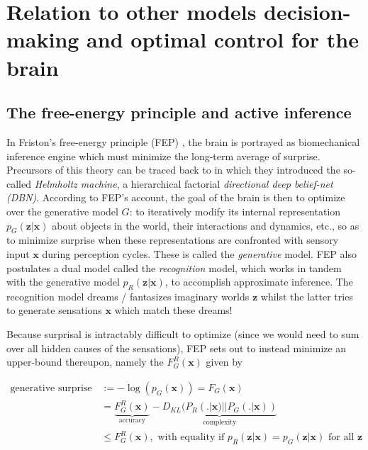 \documentclass[10pt,letterpaper]{article}
\def\z{\mathbf{z}}
\def\x{\mathbf{x}}
\begin{document}
\section{Relation to other models decision-making and optimal control for the brain}
\subsection{The free-energy principle and active inference}
In Friston's free-energy principle (FEP) \citep{friston2010free,fristonAIorRL}, the brain is portrayed
as biomechanical inference engine which must minimize the long-term average of surprise.
Precursors of this theory can be traced back to \citep{dayan1995helmholtz} in which they introduced the so-called \textit{Helmholtz machine}, a hierarchical factorial \textit{directional deep belief-net (DBN)}. According to FEP's account, the goal of the brain is then to optimize over the generative model $G$: to iteratively
modify its internal representation $p_G(\z|\x)$ about objects in the world, their interactions and dynamics, etc., so as to minimize surprise when these representations are confronted with sensory input $\x$ during perception cycles. These is called the \textit{generative} model. FEP also postulates a dual model called the \textit{recognition} model,
which works in tandem with the generative model $p_R(\z|\x)$, to accomplish approximate inference. The recognition model dreams / fantasizes imaginary worlds $\z$ whilst the latter tries to generate sensations $\x$ which match these dreams!

Because surprisal is intractably difficult to optimize (since we would need to sum over all hidden causes of the sensations), FEP sets out to instead minimize an upper-bound thereupon, namely the  $F_G^R(\x)$ given by

  \begin{equation}
    \begin{split}
      \text{generative surprise } &:= -\log(p_G(\x)) = F_G(\x) \\
      &=\underbrace{F^R_G(\x)}_{\text{accuracy}} - \underbrace{D_{KL}(P_R(.|\x) || P_G(.|\x))}_{\text{complexity}} \\
      &\le F^R_G(\x),
      \text{ with equality if }p_R(\z|\x) = p_G(\z|\x)\text{ for all } \z
    \end{split}
  \end{equation}
\end{document}
